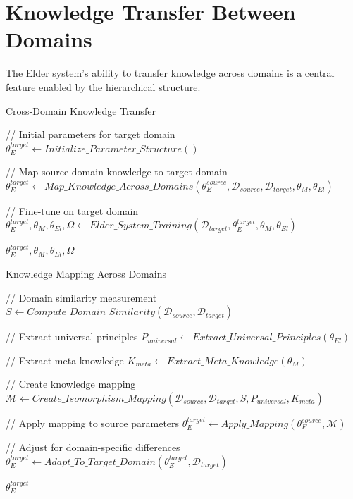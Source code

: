 \section{Knowledge Transfer Between Domains}



The Elder system's ability to transfer knowledge across domains is a central feature enabled by the hierarchical structure.

\begin{algorithm}
\caption{Cross-Domain Knowledge Transfer}
\begin{algorithmic}[1]
    \State // Initial parameters for target domain
    \State $\theta_E^{target} \gets Initialize\_Parameter\_Structure()$
    
    \State // Map source domain knowledge to target domain
    \State $\theta_E^{target} \gets Map\_Knowledge\_Across\_Domains(\theta_E^{source}, \mathcal{D}_{source}, \mathcal{D}_{target}, \theta_M, \theta_{El})$
    
    \State // Fine-tune on target domain
    \State $\theta_E^{target}, \theta_M, \theta_{El}, \Omega \gets Elder\_System\_Training(\mathcal{D}_{target}, \theta_E^{target}, \theta_M, \theta_{El})$
    
    \State \Return $\theta_E^{target}, \theta_M, \theta_{El}, \Omega$
\EndFunction
\end{algorithmic}
\end{algorithm}

\begin{algorithm}
\caption{Knowledge Mapping Across Domains}
\begin{algorithmic}[1]
    \State // Domain similarity measurement
    \State $S \gets Compute\_Domain\_Similarity(\mathcal{D}_{source}, \mathcal{D}_{target})$
    
    \State // Extract universal principles
    \State $P_{universal} \gets Extract\_Universal\_Principles(\theta_{El})$
    
    \State // Extract meta-knowledge
    \State $K_{meta} \gets Extract\_Meta\_Knowledge(\theta_M)$
    
    \State // Create knowledge mapping
    \State $\mathcal{M} \gets Create\_Isomorphism\_Mapping(\mathcal{D}_{source}, \mathcal{D}_{target}, S, P_{universal}, K_{meta})$
    
    \State // Apply mapping to source parameters
    \State $\theta_E^{target} \gets Apply\_Mapping(\theta_E^{source}, \mathcal{M})$
    
    \State // Adjust for domain-specific differences
    \State $\theta_E^{target} \gets Adapt\_To\_Target\_Domain(\theta_E^{target}, \mathcal{D}_{target})$
    
    \State \Return $\theta_E^{target}$
\EndFunction
\end{algorithmic}
\end{algorithm}

